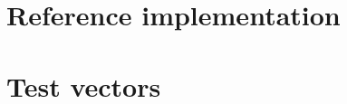 \documentclass{article}
\begin{document}
\break
\appendix

\section{Reference implementation}



\break
\section{Test vectors}


\end{document}
